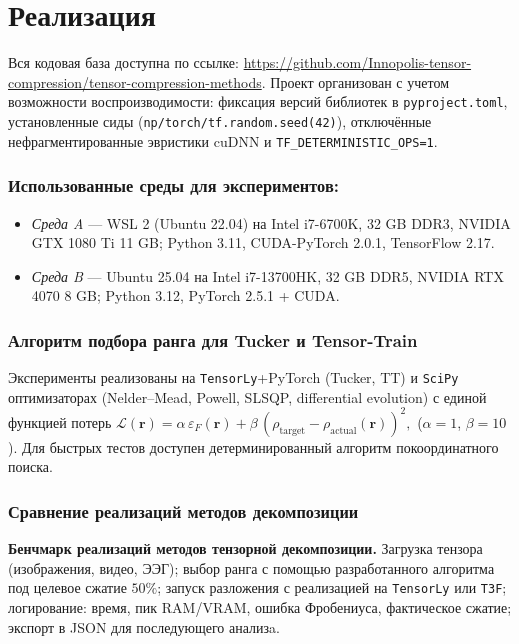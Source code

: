\chapter{Реализация}
\label{chap:implementation}

Вся кодовая база доступна по ссылке: \url{https://github.com/Innopolis-tensor-compression/tensor-compression-methods}. Проект организован с учетом возможности воспроизводимости: фиксация версий библиотек в \texttt{pyproject.toml}, установленные сиды (\texttt{np/torch/tf.random.seed(42)}), отключённые нефрагментированные эвристики cuDNN и \texttt{TF\_DETERMINISTIC\_OPS=1}.

\begingroup
\sloppy
\subsection*{Использованные среды для экспериментов:}
\begin{itemize}\setlength\itemsep{0.15em}
    \item \emph{Среда A} — WSL 2 (Ubuntu 22.04) на Intel i7-6700K, 32 GB DDR3, NVIDIA GTX 1080 Ti 11 GB; Python 3.11, CUDA-PyTorch 2.0.1, TensorFlow 2.17.  
    \item \emph{Среда B} — Ubuntu 25.04 на Intel i7-13700HK, 32 GB DDR5, NVIDIA RTX 4070 8 GB; Python 3.12, PyTorch 2.5.1 + CUDA.  
\end{itemize}
\endgroup


\subsection*{Алгоритм подбора ранга для Tucker и Tensor-Train}  
Эксперименты реализованы на \texttt{TensorLy}+PyTorch (Tucker, TT) и \texttt{SciPy} оптимизаторах (Nelder–Mead, Powell, SLSQP, differential evolution) с единой функцией потерь $\mathcal{L}(\mathbf r)=
\alpha\,\varepsilon_F(\mathbf r)+
\beta\,(\rho_{\text{target}}-\rho_{\text{actual}}(\mathbf r))^{2},$ ($\alpha{=}1$, $\beta{=}10$).  Для быстрых тестов доступен детерминированный алгоритм покоординатного поиска.

\subsection*{Сравнение реализаций методов декомпозиции}

\textbf{Бенчмарк реализаций методов тензорной декомпозиции.} 
\begingroup
\sloppy
Загрузка тензора (изображения, видео, ЭЭГ); выбор ранга с помощью разработанного алгоритма под целевое сжатие $50\%$; запуск разложения с реализацией на \texttt{TensorLy} или \texttt{T3F}; логирование: время, пик RAM/V\!RAM, ошибка Фробениуса, фактическое сжатие; экспорт в JSON для последующего анализa.  
\endgroup

